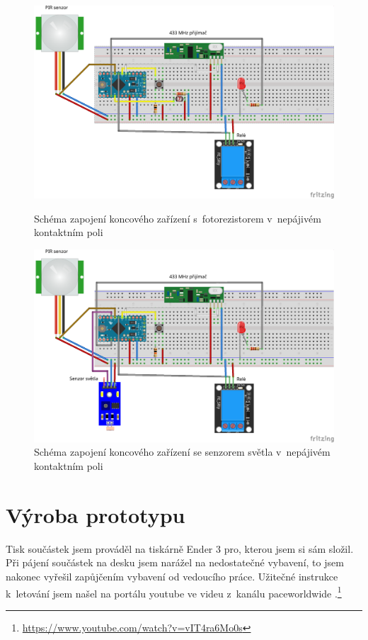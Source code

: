 \documentclass[11pt,a4paper,twoside,openright]{report}
\begin{document}
	\begin{figure}[!]
		\centering
		\includegraphics[width=1\hsize]{img/přijímač_zásuvka_bb.png}
		\caption{Schéma zapojení koncového zařízení s~fotorezistorem v~nepájivém kontaktním poli}
		
		\includegraphics[width=1\hsize]{img/přijímač_zásuvka_modul_bb.png}
		\caption{Schéma zapojení koncového zařízení se senzorem světla v~nepájivém kontaktním poli}
	\end{figure}
	
	\section{Výroba prototypu}
	
	Tisk součástek jsem prováděl na tiskárně Ender 3 pro, kterou jsem si sám složil. Při pájení součástek na desku jsem narážel na nedostatečné vybavení, to jsem nakonec vyřešil zapůjčením vybavení od vedoucího práce. Užitečné instrukce k~letování jsem našel na portálu youtube ve videu  z~kanálu paceworldwide
	.\footnote{\url{https://www.youtube.com/watch?v=vIT4ra6Mo0s}}
	
\end{document}
